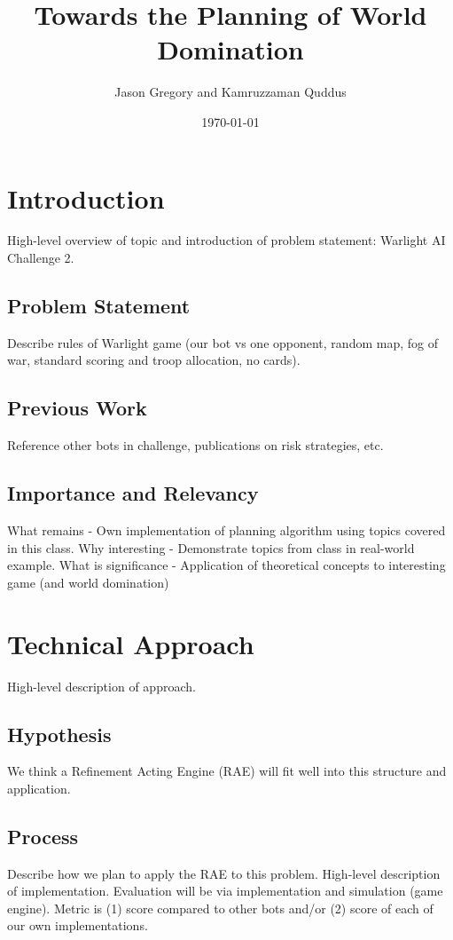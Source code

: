 \documentclass[a4paper,11pt]{article}
\begin{document}
\title{Towards the Planning of World Domination}
\author{Jason Gregory and Kamruzzaman Quddus}
\date{\today}

\maketitle

%
\section{Introduction}\label{sec:intro}
High-level overview of topic and introduction of problem statement: Warlight AI Challenge 2.

\subsection{Problem Statement}\label{sec:problem}
Describe rules of Warlight game (our bot vs one opponent, random map, fog of war, standard scoring and troop allocation, no cards).

\subsection{Previous Work}\label{sec:previous}
Reference other bots in challenge, publications on risk strategies, etc.

\subsection{Importance and Relevancy}\label{sec:importance}
What remains - Own implementation of planning algorithm using topics covered in this class.
Why interesting - Demonstrate topics from class in real-world example.
What is significance - Application of theoretical concepts to interesting game (and world domination)

%
\section{Technical Approach}\label{sec:approach}
High-level description of approach.

\subsection{Hypothesis}\label{sec:hypothesis}
We think a Refinement Acting Engine (RAE) will fit well into this structure and application.

\subsection{Process}\label{sec:process}
Describe how we plan to apply the RAE to this problem. 
High-level description of implementation. 
Evaluation will be via implementation and simulation (game engine).
Metric is (1) score compared to other bots and/or (2) score of each of our own implementations.
\end{document}
